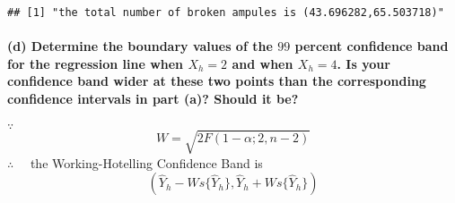 \documentclass[]{article}
\let\oldparagraph\paragraph
\renewcommand{\paragraph}[1]{\oldparagraph{#1}\mbox{}}
\begin{document}
\begin{verbatim}
## [1] "the total number of broken ampules is (43.696282,65.503718)"
\end{verbatim}

\paragraph{\texorpdfstring{(d) Determine the boundary values of the
\(99\) percent confidence band for the regression line when \(X_h = 2\)
and when \(X_h = 4\). Is your confidence band wider at these two points
than the corresponding confidence intervals in part (a)? Should it
be?}{(d) Determine the boundary values of the 99 percent confidence band for the regression line when X\_h = 2 and when X\_h = 4. Is your confidence band wider at these two points than the corresponding confidence intervals in part (a)? Should it be?}}\label{d-determine-the-boundary-values-of-the-99-percent-confidence-band-for-the-regression-line-when-x_h-2-and-when-x_h-4.-is-your-confidence-band-wider-at-these-two-points-than-the-corresponding-confidence-intervals-in-part-a-should-it-be}

\(\because\quad\) \[W=\sqrt{2F(1-\alpha;2,n-2)}\] \(\therefore\quad\)
the Working-Hotelling Confidence Band is
\[(\hat{Y}_h-Ws\{\hat{Y}_h\},\hat{Y}_h+Ws\{\hat{Y}_h\})\]
\end{document}
